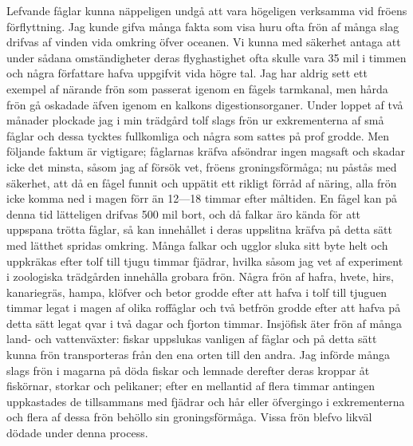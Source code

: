 Lefvande fåglar kunna näppeligen undgå att vara högeligen verksamma vid fröens förflyttning. Jag kunde gifva många fakta som visa huru ofta frön af många slag drifvas af vinden vida omkring öfver oceanen. Vi kunna med säkerhet antaga att under sådana omständigheter deras flyghastighet ofta skulle vara 35 mil i timmen och några författare hafva uppgifvit vida högre tal. Jag har aldrig sett ett exempel af närande frön som passerat igenom en fågels tarmkanal, men hårda frön gå oskadade äfven igenom en kalkons digestionsorganer. Under loppet af två månader plockade jag i min trädgård tolf slags frön ur exkrementerna af små fåglar och dessa tycktes fullkomliga och några som sattes på prof grodde. Men följande faktum är vigtigare; fåglarnas kräfva afsöndrar ingen magsaft och skadar icke det minsta, såsom jag af försök vet, fröens groningsförmåga; nu påstås med säkerhet, att då en fågel funnit och uppätit ett rikligt förråd af näring, alla frön icke komma ned i magen förr än 12—18 timmar efter måltiden. En fågel kan på denna tid lätteligen drifvas 500 mil bort, och då falkar äro kända för att uppspana trötta fåglar, så kan innehållet i deras uppslitna kräfva på detta sätt med lätthet spridas omkring. Många falkar och ugglor sluka sitt byte helt och uppkräkas efter tolf till tjugu timmar fjädrar, hvilka såsom jag vet af experiment i zoologiska trädgården innehålla grobara frön. Några frön af hafra, hvete, hirs, kanariegräs, hampa, klöfver och betor grodde efter att hafva i tolf till tjuguen timmar legat i magen af olika roffåglar och två betfrön grodde efter att hafva på detta sätt legat qvar i två dagar och fjorton timmar. Insjöfisk äter frön af många land- och vattenväxter: fiskar uppslukas vanligen af fåglar och på detta sätt kunna frön transporteras från den ena orten till den andra. Jag införde många slags frön i magarna på döda fiskar och lemnade derefter deras kroppar åt fiskörnar, storkar och pelikaner; efter en mellantid af flera timmar antingen uppkastades de tillsammans med fjädrar och hår eller öfvergingo i exkrementerna och flera af dessa frön behöllo sin groningsförmåga. Vissa frön blefvo likväl dödade under denna process.

